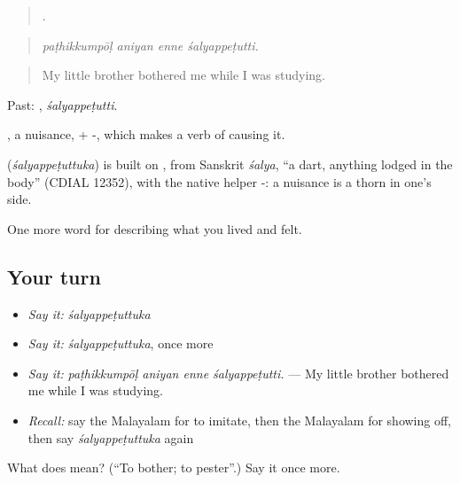 \begin{quote}
   .
\end{quote}

\begin{quote}
\emph{paṭhikkumpōḷ aniyan enne śalyappeṭutti.}
\end{quote}

\begin{quote}
My little brother bothered me while I was studying.
\end{quote}

Past: , \emph{śalyappeṭutti}.

, a nuisance, + -, which makes a verb of causing it.

\begin{cousinweb}
\textbf{} (\emph{śalyappeṭuttuka}) is built on , from Sanskrit \emph{śalya}, \textquotedblleft{}a dart, anything lodged in the body\textquotedblright{} (CDIAL 12352), with the native helper -: a nuisance is a thorn in one's side.
\end{cousinweb}

\begin{grammarlens}[title={What you've built}]
One more word for describing what you lived and felt.
\end{grammarlens}

\subsection*{Your turn}
\begin{itemize}
\raggedright
  \item \emph{Say it:} \emph{śalyappeṭuttuka}
  \item \emph{Say it:} \emph{śalyappeṭuttuka}, once more
  \item \emph{Say it:} \emph{paṭhikkumpōḷ aniyan enne śalyappeṭutti.} — My little brother bothered me while I was studying.
  \item \emph{Recall:} say the Malayalam for to imitate, then the Malayalam for showing off, then say \emph{śalyappeṭuttuka} again
\end{itemize}

\begin{tcolorbox}[breakable,colback=teal!4,colframe=teal!35!black,title={Before you move on}]
What does  mean? (\textquotedblleft{}To bother; to pester\textquotedblright{}.) Say it once more.
\end{tcolorbox}
